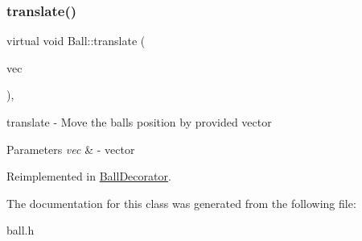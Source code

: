 \subsubsection{\texorpdfstring{translate()}{translate()}}
{\footnotesize\ttfamily virtual void Ball\+::translate (\begin{DoxyParamCaption}\item[{Q\+Vector2D}]{vec }\end{DoxyParamCaption})\hspace{0.3cm}{\ttfamily [inline]}, {\ttfamily [virtual]}}



translate -\/ Move the ball\textquotesingle{}s position by provided vector 


\begin{DoxyParams}{Parameters}
{\em vec} & -\/ vector \\
\hline
\end{DoxyParams}


Reimplemented in \mbox{\hyperlink{class_ball_decorator_aae30ba0b71629db797e0ea2639c5e32d}{Ball\+Decorator}}.



The documentation for this class was generated from the following file\+:\begin{DoxyCompactItemize}
\item 
ball.\+h\end{DoxyCompactItemize}
